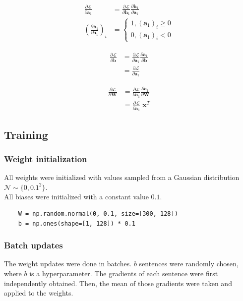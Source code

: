 \documentclass{article}
\numberwithin{equation}{section}
\begin{document}
\begin{equation}
\begin{split}
	\frac{\partial\mathcal{L}}{\partial\bm{a}_1}
		&= \frac{\partial\mathcal{L}}{\partial\bm{h}_1} \frac{\partial\bm{h}_1}{\partial\bm{a}_1} \\
	\left(\frac{\partial\bm{h}_1}{\partial\bm{a}_1}\right)_i 
		&= \left\{\begin{matrix}
			1, (\bm{a}_1)_i \geq 0 \\ 
			0, (\bm{a}_1)_i < 0
			\end{matrix}\right.
\end{split}
\end{equation}

\begin{equation}
\begin{split}
	\frac{\partial\mathcal{L}}{\partial\bm{b}}
		&= \frac{\partial\mathcal{L}}{\partial\bm{a}_1} \frac{\partial\bm{a}_1}{\partial\bm{b}} \\
		&= \frac{\partial\mathcal{L}}{\partial\bm{a}_1}
\end{split}
\end{equation}

\begin{equation}
\begin{split}
	\frac{\partial\mathcal{L}}{\partial\bm{W}}
		&= \frac{\partial\mathcal{L}}{\partial\bm{a}_1} \frac{\partial\bm{a}_1}{\partial\bm{W}} \\
		&= \frac{\partial\mathcal{L}}{\partial\bm{a}_1} \;\bm{x}^T
\end{split}
\end{equation}

\subsection{Training}
\subsubsection{Weight initialization}
All weights were initialized with values sampled from a Gaussian distribution $\mathcal{N} \sim \{0, 0.1^2\}$.\\
All biases were initialized with a constant value $0.1$.

\begin{verbatim}
    W = np.random.normal(0, 0.1, size=[300, 128])
    b = np.ones(shape=[1, 128]) * 0.1
\end{verbatim}

\subsubsection{Batch updates}
The weight updates were done in batches. $b$ sentences were randomly chosen, where $b$ is a hyperparameter. The gradients of each sentence were first independently obtained. Then, the mean of those gradients were taken and applied to the weights.\\
\end{document}
